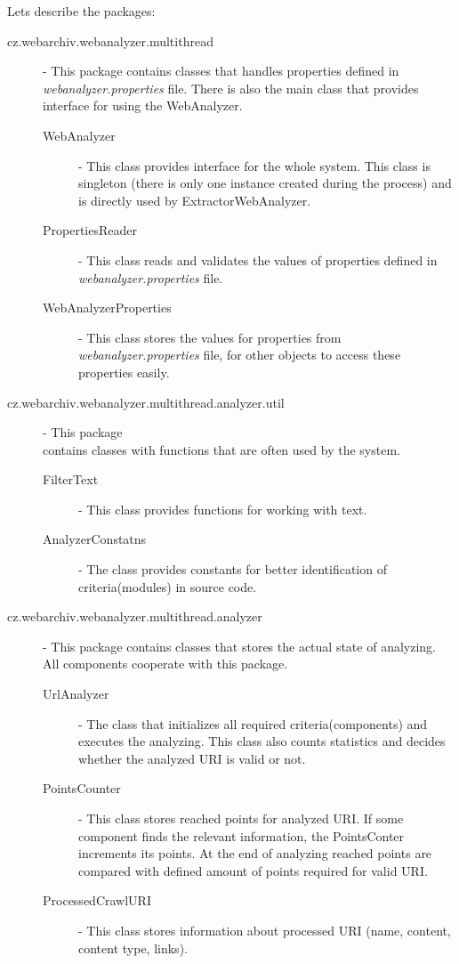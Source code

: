 \documentclass[11pt,a4paper]{article}
\begin{document}
Lets describe the packages:

\begin{description}
\item[cz.webarchiv.webanalyzer.multithread] - This package contains classes that handles properties defined in \emph{webanalyzer.properties} file. There is also the main class that provides interface for using the WebAnalyzer.

\begin{description}
\item[WebAnalyzer] - This class provides interface for the whole system. This class is singleton (there is only one instance created during the process) and is directly used by ExtractorWebAnalyzer.
\item[PropertiesReader] - This class reads and validates the values of pro\-per\-ties defined in \emph{webanalyzer.properties} file.
\item[WebAnalyzerProperties] - This class stores the values for properties from \emph{webanalyzer.properties} file, for other objects to access these properties easily.
\end{description}

\item[cz.webarchiv.webanalyzer.multithread.analyzer.util] - This package \\contains classes with functions that are often used by the system.
\begin{description}
\item[FilterText] - This class provides functions for working with text.
\item[AnalyzerConstatns] - The class provides constants for better identification of criteria(modules) in source code.
\end{description}

\item[cz.webarchiv.webanalyzer.multithread.analyzer] - This package contains classes that stores the actual state of analyzing. All components cooperate with this package.
\begin{description}
\item[UrlAnalyzer] - The class that initializes all required criteria(com\-po\-nent\-s) and executes the analyzing. This class also counts statistics and decides whether the analyzed URI is valid or not.
\item[PointsCounter] - This class stores reached points for analyzed URI. If some component finds the relevant information, the PointsConter increments its points. At the end of analyzing reached points are compared with defined amount of points required for valid URI.
\item[ProcessedCrawlURI] - This class stores information about processed URI (name, content, content type, links).
\end{description}


\end{description}
\end{document}
